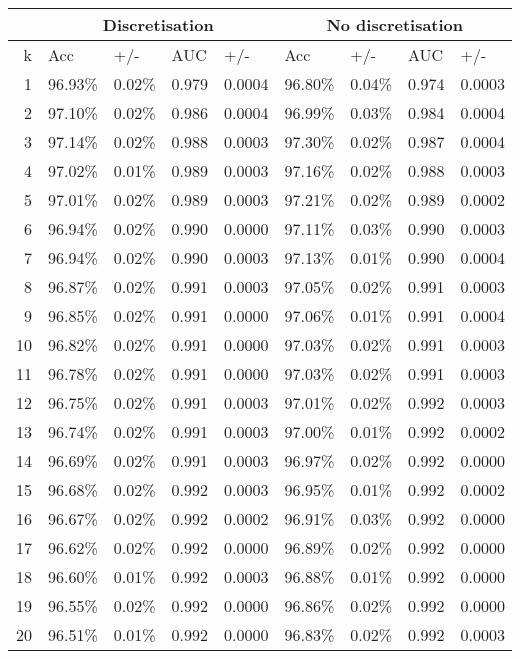 \begin{table}[htbp]
\caption{}
\begin{tabular}{|r|r|r|r|r|r|r|r|r|}
\hline
\multicolumn{1}{|l|}{} & \multicolumn{ 4}{c|}{Discretisation} & \multicolumn{ 4}{c|}{No discretisation} \\ \hline
k & \multicolumn{1}{l|}{Acc} & \multicolumn{1}{l|}{+/-} & \multicolumn{1}{l|}{AUC} & \multicolumn{1}{l|}{+/-} & \multicolumn{1}{l|}{Acc} & \multicolumn{1}{l|}{+/-} & \multicolumn{1}{l|}{AUC} & \multicolumn{1}{l|}{+/-} \\ \hline
1 & 96.93\% & 0.02\% & 0.979 & 0.0004 & 96.80\% & 0.04\% & 0.974 & 0.0003 \\ \hline
2 & 97.10\% & 0.02\% & 0.986 & 0.0004 & 96.99\% & 0.03\% & 0.984 & 0.0004 \\ \hline
3 & 97.14\% & 0.02\% & 0.988 & 0.0003 & 97.30\% & 0.02\% & 0.987 & 0.0004 \\ \hline
4 & 97.02\% & 0.01\% & 0.989 & 0.0003 & 97.16\% & 0.02\% & 0.988 & 0.0003 \\ \hline
5 & 97.01\% & 0.02\% & 0.989 & 0.0003 & 97.21\% & 0.02\% & 0.989 & 0.0002 \\ \hline
6 & 96.94\% & 0.02\% & 0.990 & 0.0000 & 97.11\% & 0.03\% & 0.990 & 0.0003 \\ \hline
7 & 96.94\% & 0.02\% & 0.990 & 0.0003 & 97.13\% & 0.01\% & 0.990 & 0.0004 \\ \hline
8 & 96.87\% & 0.02\% & 0.991 & 0.0003 & 97.05\% & 0.02\% & 0.991 & 0.0003 \\ \hline
9 & 96.85\% & 0.02\% & 0.991 & 0.0000 & 97.06\% & 0.01\% & 0.991 & 0.0004 \\ \hline
10 & 96.82\% & 0.02\% & 0.991 & 0.0000 & 97.03\% & 0.02\% & 0.991 & 0.0003 \\ \hline
11 & 96.78\% & 0.02\% & 0.991 & 0.0000 & 97.03\% & 0.02\% & 0.991 & 0.0003 \\ \hline
12 & 96.75\% & 0.02\% & 0.991 & 0.0003 & 97.01\% & 0.02\% & 0.992 & 0.0003 \\ \hline
13 & 96.74\% & 0.02\% & 0.991 & 0.0003 & 97.00\% & 0.01\% & 0.992 & 0.0002 \\ \hline
14 & 96.69\% & 0.02\% & 0.991 & 0.0003 & 96.97\% & 0.02\% & 0.992 & 0.0000 \\ \hline
15 & 96.68\% & 0.02\% & 0.992 & 0.0003 & 96.95\% & 0.01\% & 0.992 & 0.0002 \\ \hline
16 & 96.67\% & 0.02\% & 0.992 & 0.0002 & 96.91\% & 0.03\% & 0.992 & 0.0000 \\ \hline
17 & 96.62\% & 0.02\% & 0.992 & 0.0000 & 96.89\% & 0.02\% & 0.992 & 0.0000 \\ \hline
18 & 96.60\% & 0.01\% & 0.992 & 0.0003 & 96.88\% & 0.01\% & 0.992 & 0.0000 \\ \hline
19 & 96.55\% & 0.02\% & 0.992 & 0.0000 & 96.86\% & 0.02\% & 0.992 & 0.0000 \\ \hline
20 & 96.51\% & 0.01\% & 0.992 & 0.0000 & 96.83\% & 0.02\% & 0.992 & 0.0003 \\ \hline
\end{tabular}
\label{}
\end{table}
